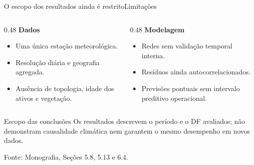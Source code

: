 \documentclass[10pt]{beamer}
\newcommand{\source}[1]{%
  \par\vfill{\raggedleft\tiny\color{gray}Fonte: #1\par}%
}
\begin{document}
\begin{frame}{O escopo dos resultados ainda é restrito}{Limitações}
  \begin{columns}[T,onlytextwidth]
    \begin{column}{0.48\textwidth}
      \textbf{\large Dados}
      \begin{itemize}
        \item Uma única estação meteorológica.
        \item Resolução diária e geografia agregada.
        \item Ausência de topologia, idade dos ativos e vegetação.
      \end{itemize}
    \end{column}
    \begin{column}{0.48\textwidth}
      \textbf{\large Modelagem}
      \begin{itemize}
        \item Redes sem validação temporal interna.
        \item Resíduos ainda autocorrelacionados.
        \item Previsões pontuais sem intervalo preditivo operacional.
      \end{itemize}
    \end{column}
  \end{columns}

  \vspace{0.8em}
  \begin{block}{Escopo das conclusões}
    Os resultados descrevem o período e o DF avaliados; não demonstram causalidade climática nem garantem o mesmo desempenho em novos dados.
  \end{block}

  \source{Monografia, Seções 5.8, 5.13 e 6.4.}
\end{frame}
\end{document}
